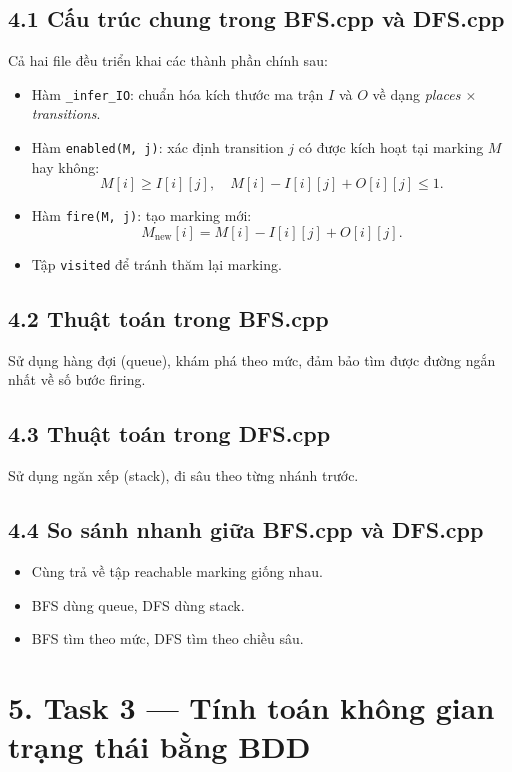 \documentclass[12pt,a4paper]{article}
\begin{document}
\subsection*{4.1 Cấu trúc chung trong BFS.cpp và DFS.cpp}
Cả hai file đều triển khai các thành phần chính sau:
\begin{itemize}
    \item Hàm \texttt{\_infer\_IO}: chuẩn hóa kích thước ma trận $I$ và $O$ về dạng \textit{places $\times$ transitions}.
    \item Hàm \texttt{enabled(M, j)}: xác định transition $j$ có được kích hoạt tại marking $M$ hay không:
    \[
    M[i] \ge I[i][j], \quad M[i] - I[i][j] + O[i][j] \le 1.
    \]
    \item Hàm \texttt{fire(M, j)}: tạo marking mới:
    \[
    M_{\text{new}}[i] = M[i] - I[i][j] + O[i][j].
    \]
    \item Tập \texttt{visited} để tránh thăm lại marking.
\end{itemize}

\subsection*{4.2 Thuật toán trong BFS.cpp}
Sử dụng hàng đợi (queue), khám phá theo mức, đảm bảo tìm được đường ngắn nhất về số bước firing.

\subsection*{4.3 Thuật toán trong DFS.cpp}
Sử dụng ngăn xếp (stack), đi sâu theo từng nhánh trước.

\subsection*{4.4 So sánh nhanh giữa BFS.cpp và DFS.cpp}
\begin{itemize}
    \item Cùng trả về tập reachable marking giống nhau.
    \item BFS dùng queue, DFS dùng stack.
    \item BFS tìm theo mức, DFS tìm theo chiều sâu.
\end{itemize}

\section*{5. Task 3 --- Tính toán không gian trạng thái bằng BDD}
\end{document}
